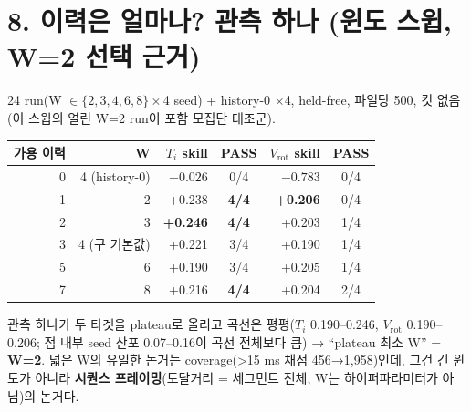 \documentclass[10pt,a4paper]{article}
\newcommand{\Ti}{\ensuremath{T_i}}
\newcommand{\Vrot}{\ensuremath{V_\mathrm{rot}}}
\newcommand{\pass}[1]{\textbf{#1}}
\begin{document}
\section*{8. 이력은 얼마나? 관측 하나 (윈도 스윕, W=2 선택 근거)}
24 run(W $\in\{2,3,4,6,8\}\times$4 seed) + history-0 $\times$4, held-free, 파일당 500, 컷 없음(이 스윕의 얼린 W=2 run이 포함 모집단 대조군).
\begin{center}\small
\begin{tabular}{rrrcrc}\toprule
가용 이력 & W & \Ti{} skill & PASS & \Vrot{} skill & PASS \\ \midrule
0 & 4 (history-0) & $-0.026$ & 0/4 & $-0.783$ & 0/4 \\
1 & 2 & +0.238 & \pass{4/4} & \pass{+0.206} & 0/4 \\
2 & 3 & \pass{+0.246} & \pass{4/4} & +0.203 & 1/4 \\
3 & 4 (구 기본값) & +0.221 & 3/4 & +0.190 & 1/4 \\
5 & 6 & +0.190 & 3/4 & +0.205 & 1/4 \\
7 & 8 & +0.216 & \pass{4/4} & +0.204 & 2/4 \\ \bottomrule
\end{tabular}
\end{center}
관측 하나가 두 타겟을 plateau로 올리고 곡선은 평평(\Ti{} 0.190–0.246, \Vrot{} 0.190–0.206; 점 내부 seed 산포 0.07–0.16이 곡선 전체보다 큼) → ``plateau 최소 W'' = \textbf{W=2}. 넓은 W의 유일한 논거는 coverage(>15 ms 채점 456→1,958)인데, 그건 긴 윈도가 아니라 \textbf{시퀀스 프레이밍}(도달거리 = 세그먼트 전체, W는 하이퍼파라미터가 아님)의 논거다.
\end{document}
